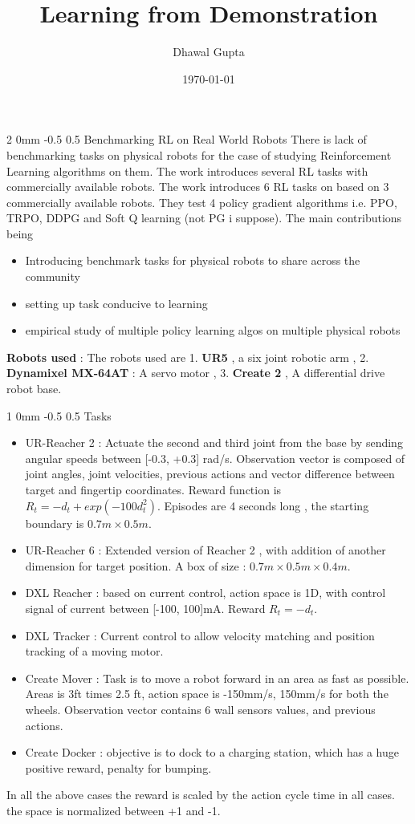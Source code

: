 \documentclass[twocolumn,11pt]{article}
\title{Learning from Demonstration }
\author{Dhawal Gupta}
\date{\today}
\makeatletter
\renewcommand{\section}{\@startsection
{section}%
{2}%
{0mm}%
{-0.5\baselineskip}%
{0.5\baselineskip}%
{\bfseries\color{blue}}} %
\renewcommand{\subsection}{\@startsection
{subsection}%
{1}%
{0mm}%
{-0.5\baselineskip}%
{0.5\baselineskip}%
{\bfseries\color{blue}}} %
\makeatother
\begin{document}
\maketitle

\section{Benchmarking RL on Real World Robots}
There is lack of benchmarking tasks on physical robots for the case of studying Reinforcement Learning algorithms  on them. The  work introduces several RL  tasks with commercially available robots. The  work  introduces 6 RL  tasks on based on 3  commercially available robots. They test 4 policy gradient algorithms i.e.  PPO,  TRPO, DDPG and Soft Q learning (not PG i suppose). The main contributions being 
\begin{itemize}
\item Introducing benchmark tasks for physical robots to share  across the community
\item setting up task conducive to learning
\item empirical  study  of multiple policy learning algos on multiple physical robots
\end{itemize} 
\textbf{Robots used}  : The robots used are 1. \textbf{UR5}  ,  a six joint robotic arm , 2. \textbf{Dynamixel  MX-64AT}  : A servo motor , 3. \textbf{Create 2} , A differential drive robot base.
\subsection{Tasks}
\begin{itemize}
\item UR-Reacher 2 : Actuate the second and third joint from the base by sending angular speeds between [-0.3, +0.3] rad/s. Observation vector is composed of joint angles, joint velocities, previous actions and vector difference between target and fingertip coordinates. Reward function is $R_t = - d_t  + exp(-100 d_t^2)$. Episodes are 4  seconds long , the starting boundary is $0.7m \times 0.5m$.
\item UR-Reacher 6 : Extended version of Reacher 2  , with addition of another dimension for target position. A box of size : $0.7m \times 0.5m \times 0.4m$.
\item DXL Reacher : based  on current control, action space is 1D, with control signal  of current between [-100, 100]mA. Reward $R_t = -d_t$.
\item DXL Tracker : Current  control to allow velocity matching and position tracking of a moving motor. 
\item Create Mover : Task is to move a robot forward in an area as fast as possible. Areas is 3ft times  2.5 ft, action space is -150mm/s, 150mm/s  for both the wheels. Observation vector contains 6 wall sensors values, and previous actions. 
\item Create  Docker : objective is to dock to a charging station, which  has a huge positive reward, penalty for bumping. 
\end{itemize}
In all the above cases the reward is scaled by the action cycle time in all cases. the  space is normalized between +1  and -1.
\end{document}
